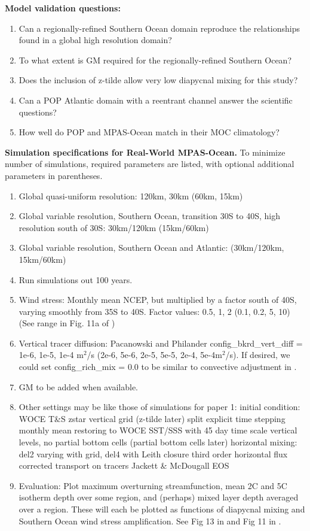 \documentclass[12pt,letterpaper]{article}
\begin{document}
{\bf Model validation questions:}
\begin{enumerate}
\item Can a regionally-refined Southern Ocean domain reproduce the relationships found in a global high resolution domain?
\item To what extent is GM required for the regionally-refined Southern Ocean?
\item Does the inclusion of z-tilde allow very low diapycnal mixing for this study?
\item Can a POP Atlantic domain with a reentrant channel answer the scientific questions?
\item How well do POP and MPAS-Ocean match in their MOC climatology?
\end{enumerate}

{\bf Simulation specifications for Real-World MPAS-Ocean.}  To minimize number of simulations, required parameters are listed, with optional additional parameters in parentheses.
\begin{enumerate}
\item Global quasi-uniform resolution: 120km, 30km (60km, 15km)
\item Global variable resolution, Southern Ocean, transition 30S to 40S, high resolution south of 30S: 30km/120km  (15km/60km)
\item Global variable resolution, Southern Ocean and Atlantic: (30km/120km, 15km/60km)
\item Run simulations out 100 years.
\item Wind stress: Monthly mean NCEP, but multiplied by a factor south of 40S, varying smoothly from 35S to 40S.  Factor values: 0.5, 1, 2 (0.1, 0.2, 5, 10) (See range in Fig. 11a of \cite{Nikurashin_Vallis12jpo})
\item Vertical tracer diffusion: Pacanowski and Philander config\_bkrd\_vert\_diff = 1e-6, 1e-5, 1e-4 m$^2$/s (2e-6, 5e-6, 2e-5, 5e-5, 2e-4, 5e-4m$^2$/s).  If desired, we could set config\_rich\_mix = 0.0 to be similar to convective adjustment in \cite{Nikurashin_Vallis11jpo,Nikurashin_Vallis12jpo}.
\item GM to be added when available.
\item Other settings may be like those of simulations for paper 1: 
\subitem initial condition: WOCE T\&S
\subitem zstar vertical grid (z-tilde later)
\subitem split explicit time stepping
\subitem monthly mean restoring to WOCE SST/SSS with 45 day time scale
 vertical levels, no partial bottom cells (partial bottom cells later)
\subitem horizontal mixing: del2 varying with grid, del4 with Leith closure
\subitem third order horizontal flux corrected transport on tracers
\subitem Jackett \& McDougall EOS
\item Evaluation: Plot maximum overturning streamfunction, mean 2C and 5C isotherm depth over some region, and (perhaps) mixed layer depth averaged over a region.  These will each be plotted as functions of diapycnal mixing and Southern Ocean wind stress amplification.  See Fig 13 in \cite{Nikurashin_Vallis11jpo} and Fig 11 in \cite{Nikurashin_Vallis12jpo}.
\end{enumerate}
\end{document}
